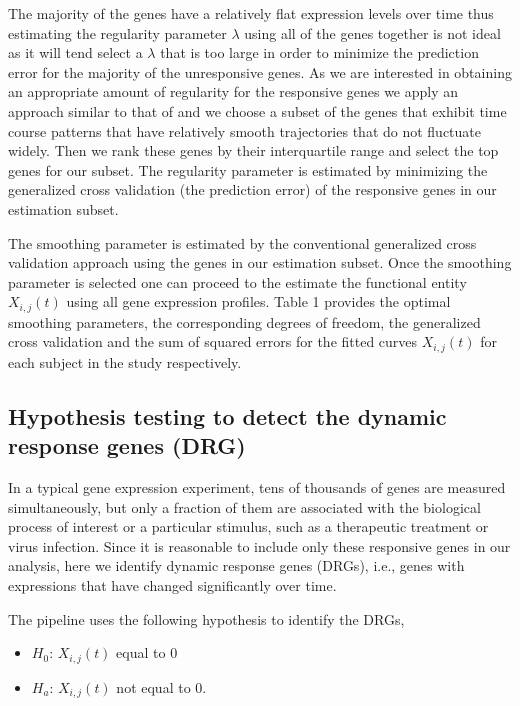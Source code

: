 The majority of the genes have a relatively flat expression levels over time thus estimating the regularity parameter $\lambda$ using all of the genes together is not ideal as it will tend select a $\lambda$ that is too large in order to minimize the prediction error for the majority of the unresponsive genes. As we are interested in obtaining an appropriate amount of regularity for the responsive genes we apply an approach similar to that of \cite{yao2005functional} and \cite{wu2013more} we choose a subset of the genes that exhibit time course patterns that have relatively smooth trajectories that do not fluctuate widely. Then we rank these genes by their interquartile range and select the top genes for our subset. The regularity parameter is estimated by minimizing the generalized cross validation (the prediction error) of the responsive genes in our estimation subset.

The smoothing parameter is estimated by the conventional generalized cross validation approach using the genes in our estimation subset. Once the smoothing parameter is selected one can proceed to the estimate the functional entity $X_{i,j}(t)$ using all gene expression profiles. Table 1 provides the optimal smoothing parameters, the corresponding degrees of freedom, the generalized cross validation and the sum of squared errors for the fitted curves $X_{i,j}(t)$ for each subject in the study respectively.

\subsection{Hypothesis testing to detect the dynamic response genes (DRG)}

In a typical gene expression experiment, tens of thousands of genes are measured simultaneously, but only a fraction of them are associated with the biological process of interest or a particular stimulus, such as a therapeutic treatment or virus infection. Since it is reasonable to include only these responsive genes in our analysis, here we identify dynamic response genes (DRGs), i.e., genes with expressions that have changed significantly over time.

The pipeline uses the following hypothesis to identify the DRGs,


\begin{itemize}

\item $H_{0}$: $X_{i,j}(t)$ equal to $0$

\item $H_{a}$: $X_{i,j}(t)$ not equal to $0$.

\end{itemize}

